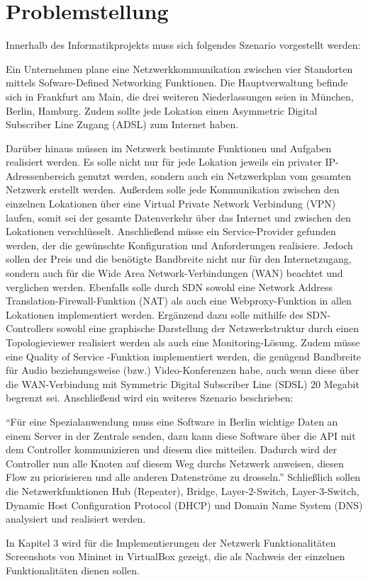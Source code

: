 \documentclass[fontsize=12pt,paper=a4,open=any,parskip=half,
  twoside=false,toc=listof,toc=bibliography,fleqn,leqno,
  captions=nooneline,captions=tableabove,british]{scrbook}
\begin{document}
\section{Problemstellung}
Innerhalb des Informatikprojekts muss sich folgendes Szenario vorgestellt werden:\par
Ein Unternehmen plane eine Netzwerkkommunikation zwischen vier Standorten mittels Sofware-Defined Networking Funktionen. Die Hauptverwaltung befinde sich in Frankfurt am Main, die drei weiteren Niederlassungen seien in München, Berlin, Hamburg. Zudem sollte jede Lokation einen Asymmetric Digital Subscriber Line Zugang (ADSL) zum Internet haben.\par
Darüber hinaus müssen im Netzwerk bestimmte Funktionen und Aufgaben realisiert werden. Es solle nicht nur für jede Lokation jeweils ein privater IP-Adressenbereich genutzt werden, sondern auch ein Netzwerkplan vom gesamten Netzwerk erstellt werden. Außerdem solle jede Kommunikation zwischen den einzelnen Lokationen über eine Virtual Private Network Verbindung (VPN) laufen, somit sei der gesamte Datenverkehr über das Internet und zwischen den Lokationen verschlüsselt. Anschließend müsse ein Service-Provider gefunden werden, der die gewünschte Konfiguration und Anforderungen realisiere. Jedoch sollen der Preis und die benötigte Bandbreite nicht nur für den Internetzugang, sondern auch für die Wide Area Network-Verbindungen (WAN) beachtet und verglichen werden. Ebenfalls solle durch SDN sowohl eine Network Address Translation-Firewall-Funktion (NAT) als auch eine Webproxy-Funktion in allen Lokationen implementiert werden. Ergänzend dazu solle mithilfe des SDN-Controllers sowohl eine graphische Darstellung der Netzwerkstruktur durch einen Topologieviewer realisiert werden als auch eine Monitoring-Lösung. Zudem müsse eine Quality of Service -Funktion implementiert werden, die genügend Bandbreite für Audio beziehungsweise (bzw.) Video-Konferenzen habe, auch wenn diese über die WAN-Verbindung mit Symmetric Digital Subscriber Line (SDSL) 20 Megabit begrenzt sei. Anschließend wird ein weiteres Szenario beschrieben:\par
“Für eine Spezialanwendung muss eine Software in Berlin wichtige Daten an einem Server in der Zentrale senden, dazu kann diese Software über die API mit dem Controller kommunizieren und diesem dies mitteilen. Dadurch wird der Controller nun alle Knoten auf diesem Weg durchs Netzwerk anweisen, diesen Flow zu priorisieren und alle anderen Datenströme zu drosseln.” 
Schließlich sollen die Netzwerkfunktionen Hub (Repeater), Bridge, Layer-2-Switch, Layer-3-Switch, Dynamic Host Configuration Protocol (DHCP) und Domain Name System (DNS) analysiert und realisiert werden.\par
In Kapitel 3 wird für die Implementierungen der Netzwerk Funktionalitäten Screenshots von Mininet in VirtualBox gezeigt, die als Nachweis der einzelnen Funktionalitäten dienen sollen.
\end{document}
